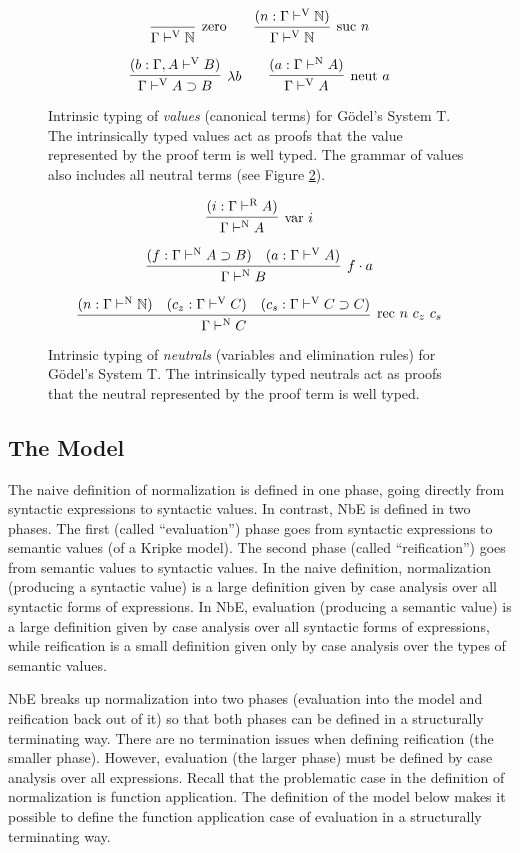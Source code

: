 \documentclass[runningheads,a4paper]{llncs}
\newcommand{\reffig}[1]{Figure \ref{fig:#1}}
\def\arr{\supset}
\def\app{\cdot}
\def\lam{\lambda}
\def\nat{\mathbb{N}}
\newcommand{\turn}[1]{\vdash^\con{#1}}
\newcommand{\con}[1]{\textmd{#1}}
\newcommand{\fun}[1]{\textmd{#1}}
\newcommand{\typv}[1]{\Gamma \turn{V} #1}
\newcommand{\ctypv}[2]{\Gamma , #1 \turn{V} #2}
\newcommand{\typn}[1]{\Gamma \turn{N} #1}
\newcommand{\typr}[1]{\Gamma \turn{R} #1}
\begin{document}
\begin{figure}[t!]
\caption{
Intrinsic typing of \textit{values} (canonical terms) for G{\"o}del's System T.
The intrinsically typed values act as proofs that the value
represented by the proof term is well typed. The grammar of values
also includes all neutral terms (see \reffig{typn}).
}
$$
\infer
  [\con{zero}]
  {\typv{\nat}}
{}
\qquad
\infer
  [\con{suc} ~ n]
  {\typv{\nat}}
{
  (n : \typv{\nat})
}
$$

$$
\infer
  [\lam b]
  {\typv{A \arr B}}
{
  (b : \ctypv{A}{B})
}
\qquad
\infer
  [\fun{neut} ~ a]
  {\typv{A}}
{
  (a : \typn{A})
}
$$
\label{fig:typv}
\end{figure}

\begin{figure}[t!]
\caption{
Intrinsic typing of \textit{neutrals} (variables and elimination rules) 
for G{\"o}del's System T.
The intrinsically typed neutrals act as proofs that the neutral
represented by the proof term is well typed.
}

$$
\infer
  [\fun{var} ~ i]
  {\typn{A}}
{
  (i : \typr{A})
}
$$

$$
\infer
  [f \app a]
  {\typn{B}}
{
  (f : \typn{A \arr B})
  &
  (a : \typv{A})
}
$$

$$
\infer
  [\fun{rec} ~ n ~ c_z ~ c_s]
  {\typn{C}}
{
  (n : \typn{\nat})
  &
  (c_z : \typv{C})
  &
  (c_s : \typv{C \arr C})
}
$$
\label{fig:typn}
\end{figure}

\subsection{The Model}

The naive definition of
normalization is defined in one phase, going directly from syntactic
expressions to syntactic values. In contrast, NbE is defined in two
phases. The first (called ``evaluation'') phase goes from syntactic expressions to semantic
values (of a Kripke model). The second phase (called ``reification'')
goes from semantic values to syntactic values. In the naive
definition, normalization (producing a syntactic value) is a large
definition given by case analysis over all syntactic forms of
expressions. In NbE, evaluation (producing a semantic value) is a
large definition given by case analysis over all syntactic forms of
expressions, while reification is a small definition given only by
case analysis over the types of semantic values.

NbE breaks up normalization into two phases (evaluation into the model
and reification back out of it) so that both phases can be defined
in a structurally terminating way. There are no termination issues
when defining reification (the smaller phase). However, evaluation
(the larger phase) must be defined by case analysis over all
expressions. Recall that the problematic
case in the definition of normalization is function application.
The definition of the
model below makes it possible to define the function application case
of evaluation in a structurally terminating way.
\end{document}
